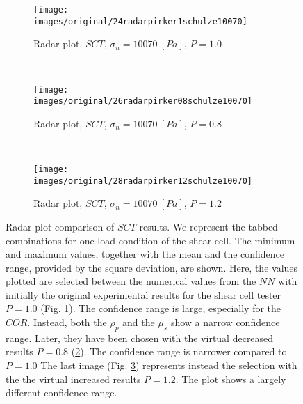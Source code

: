 \begin{figure}[htp] \centering
    \begin{subfigure}[b]{0.96\columnwidth}
        \texttt{[image: images/original/24radarpirker1schulze10070]}
        \caption{Radar plot, $SCT$, $\sigma_n=10070 ~[Pa]$, $P=1.0$}
        \label{fig:24radarpirker1schulze10070}
    \end{subfigure} \\
        \begin{subfigure}[b]{0.96\columnwidth}
        \texttt{[image: images/original/26radarpirker08schulze10070]}
        \caption{Radar plot, $SCT$, $\sigma_n=10070 ~[Pa]$, $P=0.8$}
        \label{fig:26radarpirker08schulze10070} 
    \end{subfigure}\\
        \begin{subfigure}[b]{0.96\columnwidth}
        \texttt{[image: images/original/28radarpirker12schulze10070]}
        \caption{Radar plot, $SCT$, $\sigma_n=10070 ~[Pa]$, $P=1.2$}
        \label{fig:28radarpirker12schulze10070} 
    \end{subfigure}
    \caption[Radar plot comparison of SCT results]{Radar plot comparison of
    $SCT$ results. We represent the tabbed combinations for one load condition
    of the shear cell. The minimum and maximum values, together with the mean and the confidence
	range, provided by the square deviation, are shown.
    Here, the values plotted are selected between the numerical
    values from the $NN$ with initially the original experimental results for the shear cell tester $P=1.0$ (Fig.
    \ref{fig:24radarpirker1schulze10070}). 
    The confidence range is large, especially for the $COR$.
    Instead, both the $\rho_p$  and the $\mu_s$ show a narrow confidence range. 
    Later, they have been chosen with  
    the virtual decreased results $P=0.8$
    (\ref{fig:26radarpirker08schulze10070}).
    The confidence range is narrower compared to $P=1.0$
    The last image (Fig. \ref{fig:28radarpirker12schulze10070}) represents
    instead the selection with the the virtual increased results $P=1.2$.
    The plot shows a largely different confidence range.    }
    \label{fig:29schulzeradarandcloud}
\end{figure}